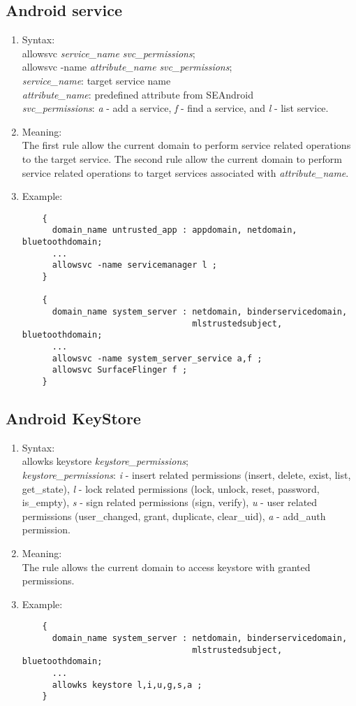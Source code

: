 \documentclass{article}
\begin{document}
\subsection{Android service}
\begin{enumerate}
	\item Syntax:\\
	allowsvc {\em service\_name} {\em svc\_permissions};\\
	allowsvc -name {\em attribute\_name} {\em svc\_permissions};\\
	{\em service\_name}: target service name\\
	{\em attribute\_name}: predefined attribute from SEAndroid\\
	{\em svc\_permissions}: {\em a} - add a service, {\em f} - find a service, 
	and {\em l} - list service.
	\item Meaning:\\
	The first rule allow the current domain to perform service related 
	operations to the target service. The second rule allow the current domain 
	to perform service related operations to target services associated with 
	{\em attribute\_name}.
	\item Example:\\
	\begin{verbatim}
	{
	  domain_name untrusted_app : appdomain, netdomain, bluetoothdomain;
	  ...
	  allowsvc -name servicemanager l ;
	}
	
	{
	  domain_name system_server : netdomain, binderservicedomain, 
	                              mlstrustedsubject, bluetoothdomain;
	  ...
	  allowsvc -name system_server_service a,f ;
	  allowsvc SurfaceFlinger f ;
	}
	\end{verbatim}
\end{enumerate}

\subsection{Android KeyStore}
\begin{enumerate}
	\item Syntax:\\
	allowks keystore {\em keystore\_permissions};\\
	{\em keystore\_permissions}: {\em i} - insert related permissions (insert, 
	delete, exist, list, get\_state), {\em l} - lock related permissions (lock, 
	unlock, reset, password, is\_empty), {\em s} - sign related permissions 
	(sign, verify), {\em u} - user related permissions (user\_changed, grant, 
	duplicate, clear\_uid), {\em a} - add\_auth permission.
	\item Meaning:\\
	The rule allows the current domain to access keystore with granted 
	permissions.
	\item Example:\\
	\begin{verbatim}
	{
	  domain_name system_server : netdomain, binderservicedomain, 
	                              mlstrustedsubject, bluetoothdomain;
	  ...
	  allowks keystore l,i,u,g,s,a ;
	}
	\end{verbatim}
\end{enumerate}
\end{document}
